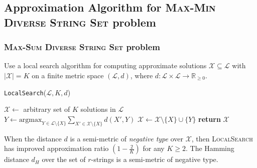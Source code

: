 \documentclass{beamer}
\begin{document}
\subsection{Approximation Algorithm for \textsc{Max-Min Diverse String Set} problem}
\begin{frame}
    \frametitle{\textsc{Max-Sum Diverse String Set} problem}
    Use a local search algorithm for computing approximate solutions $\mathcal{X} \subseteq \mathcal{L}$ with $|\mathcal{X}| = K$ on a finite metric space $(\mathcal{L}, d)$, where $d: \mathcal{L} \times \mathcal{L} \to \mathbb{R}_{\geq 0}$.

    \begin{algorithm}[H] \label{alg:LocalSearch}
        \footnotesize{\caption{\texttt{LocalSearch}($\mathcal{L}, K, d$)}}
        \footnotesize{\begin{algorithmic}[1]
                \State $\mathcal{X} \gets$ arbitrary set of $K$ solutions in $\mathcal{L}$
                \State $Y \gets \text{argmax}_{Y \in \mathcal{L} \setminus \{X\}} \sum_{X' \in \mathcal{X} \setminus \{X\}} d(X', Y)$
                \State $\mathcal{X} \gets \mathcal{X} \setminus \{X\} \cup \{Y\}$
                \EndFor
                \EndFor
                \State \textbf{return} $\mathcal{X}$
            \end{algorithmic}}
    \end{algorithm}

    \begin{theorem}
        \small{When the distance $d$ is a semi-metric of \emph{negative type} over $\mathcal{X}$, then \textsc{LocalSearch} has improved approximation ratio $(1 - \frac{2}{K})$ for any $K \geq 2$. The Hamming distance $d_H$ over the set of $r$-strings is a semi-metric of negative type.}
    \end{theorem}
\end{frame}
\end{document}
